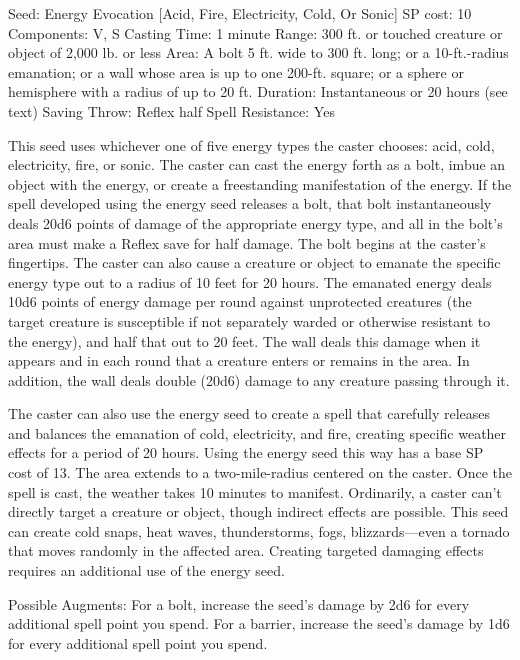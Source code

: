 Seed: Energy
Evocation [Acid, Fire, Electricity, Cold, Or Sonic]
SP cost: 10
Components: V, S
Casting Time: 1 minute
Range: 300 ft. or touched creature or object of 2,000 lb. or less
Area: A bolt 5 ft. wide to 300 ft. long; or a 10-ft.-radius emanation; or a wall whose area is up to one 200-ft. square; or a sphere or hemisphere with a radius of up to 20 ft.
Duration: Instantaneous or 20 hours (see text)
Saving Throw: Reflex half
Spell Resistance: Yes

This seed uses whichever one of five energy types the caster chooses: acid, cold, electricity, fire, or sonic. 
The caster can cast the energy forth as a bolt, imbue an object with the energy, or create a freestanding manifestation of the energy. 
If the spell developed using the energy seed releases a bolt, that bolt instantaneously deals 20d6 points of damage of the appropriate energy type, and all in the bolt's area must make a Reflex save for half damage. 
The bolt begins at the caster's fingertips. 
The caster can also cause a creature or object to emanate the specific energy type out to a radius of 10 feet for 20 hours. 
The emanated energy deals 10d6 points of energy damage per round against unprotected creatures (the target creature is susceptible if not separately warded or otherwise resistant to the energy), and half that out to 20 feet. The wall deals this damage when it appears and in each round that a creature enters or remains in the area. In addition, the wall deals double (20d6) damage to any creature passing through it.

The caster can also use the energy seed to create a spell that carefully releases and balances the emanation of cold, electricity, and fire, creating specific weather effects for a period of 20 hours. 
Using the energy seed this way has a base SP cost of 13. 
The area extends to a two-mile-radius centered on the caster. Once the spell is cast, the weather takes 10 minutes to manifest. Ordinarily, a caster can't directly target a creature or object, though indirect effects are possible. This seed can create cold snaps, heat waves, thunderstorms, fogs, blizzards—even a tornado that moves randomly in the affected area. Creating targeted damaging effects requires an additional use of the energy seed.

Possible Augments: 
For a bolt, increase the seed's damage by 2d6 for every additional spell point you spend.
For a barrier, increase the seed's damage by 1d6 for every additional spell point you spend.
